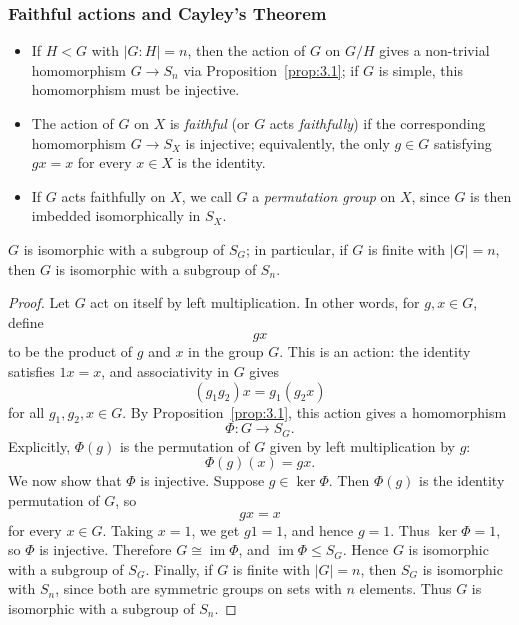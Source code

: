 \documentclass[../Odyssey_Project.tex]{subfiles}
\begin{document}
\subsubsection*{Faithful actions and Cayley's Theorem}
\begin{itemize}
    \item If $H < G$ with $|G:H| = n$, then the action of $G$ on $G/H$ gives a non-trivial homomorphism $G \to S_n$ via Proposition~\ref{prop:3.1}; if $G$ is simple, this homomorphism must be injective.
    \item The action of $G$ on $X$ is \emph{faithful} (or $G$ acts \emph{faithfully}) if the corresponding homomorphism $G \to S_X$ is injective; equivalently, the only $g \in G$ satisfying $gx = x$ for every $x \in X$ is the identity.
    \item If $G$ acts faithfully on $X$, we call $G$ a \emph{permutation group} on $X$, since $G$ is then imbedded isomorphically in $S_X$.
\end{itemize}

\begin{namedtheorem}
\label{thm:cayley}
$G$ is isomorphic with a subgroup of $S_G$; in particular, if $G$ is finite with $|G| = n$, then $G$ is isomorphic with a subgroup of $S_n$.
\end{namedtheorem}

\begin{proof}
    Let $G$ act on itself by left multiplication. In other words, for $g,x \in G$, define
    \[
        gx
    \]
    to be the product of $g$ and $x$ in the group $G$. This is an action: the identity satisfies $1x = x$, and associativity in $G$ gives
    \[
        (g_1g_2)x = g_1(g_2x)
    \]
    for all $g_1,g_2,x \in G$.
    By Proposition~\ref{prop:3.1}, this action gives a homomorphism
    \[
        \Phi \colon G \to S_G.
    \]
    Explicitly, $\Phi(g)$ is the permutation of $G$ given by left multiplication by $g$:
    \[
        \Phi(g)(x) = gx.
    \]
    We now show that $\Phi$ is injective. Suppose $g \in \ker\Phi$. Then $\Phi(g)$ is the identity permutation of $G$, so
    \[
        gx = x
    \]
    for every $x \in G$. Taking $x = 1$, we get $g1 = 1$, and hence $g = 1$. Thus $\ker\Phi = 1$, so $\Phi$ is injective.
    Therefore $G \cong \operatorname{im}\Phi$, and $\operatorname{im}\Phi \leq S_G$. Hence $G$ is isomorphic with a subgroup of $S_G$.
    Finally, if $G$ is finite with $|G| = n$, then $S_G$ is isomorphic with $S_n$, since both are symmetric groups on sets with $n$ elements. Thus $G$ is isomorphic with a subgroup of $S_n$.
\end{proof}
\end{document}
